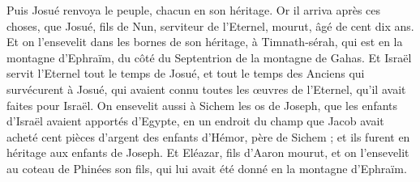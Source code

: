 \begin{multicols}{2}
Puis Josué renvoya le peuple, chacun en son héritage.
Or il arriva après ces choses, que Josué, fils de Nun, serviteur de l'Eternel, mourut, âgé de cent dix ans.
Et on l'ensevelit dans les bornes de son héritage, à Timnath-sérah, qui est en la montagne d'Ephraïm, du côté du Septentrion de la montagne de Gahas.
Et Israël servit l'Eternel tout le temps de Josué, et tout le temps des Anciens qui survécurent à Josué, qui avaient connu toutes les œuvres de l'Eternel, qu'il avait faites pour Israël.
On ensevelit aussi à Sichem les os de Joseph, que les enfants d'Israël avaient apportés d'Egypte, en un endroit du champ que Jacob avait acheté cent pièces d'argent des enfants d'Hémor, père de Sichem ; et ils furent en héritage aux enfants de Joseph.
Et Eléazar, fils d'Aaron mourut, et on l'ensevelit au coteau de Phinées son fils, qui lui avait été donné en la montagne d'Ephraïm.
\PPE{}
\end{multicols}
